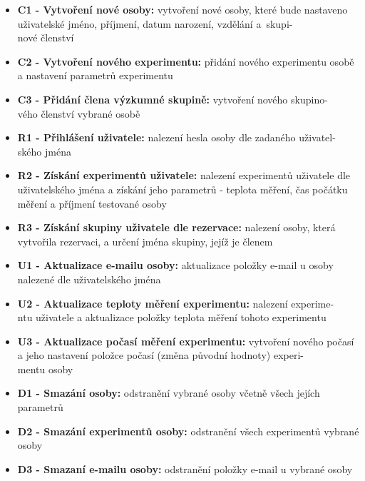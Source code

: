 \documentclass{projekt}
\begin{document}
\begin{itemize}
\item {\bf C1 - Vytvoření nové osoby:} vytvoření nové osoby, které bude nastaveno uživatelské jméno, příjmení, datum narození, vzdělání a~skupi-\\nové členství 
\item {\bf C2 - Vytvoření nového experimentu:} přidání nového experimentu osobě a nastavení  parametrů experimentu
\item {\bf C3 - Přidání člena výzkumné skupině:} vytvoření nového skupino-\\vého členství vybrané osobě

\vspace{0.65cm}

\item {\bf R1 - Přihlášení uživatele:} nalezení hesla osoby dle zadaného uživatel-\\ského jména
\item {\bf R2 - Získání experimentů uživatele:} nalezení experimentů uživatele dle uživatelského jména a získání jeho parametrů - teplota měření, čas počátku měření a příjmení testované osoby
\item {\bf R3 - Získání skupiny uživatele dle rezervace:} nalezení osoby, která vytvořila rezervaci, a určení jména skupiny, jejíž je členem

\vspace{0.65cm}

\item {\bf U1 - Aktualizace e-mailu osoby:} aktualizace položky e-mail u osoby nalezené dle uživatelského jména
\item {\bf U2 - Aktualizace teploty měření experimentu:} nalezení experime-\\ntu uživatele a aktualizace položky teplota měření tohoto experimentu
\item {\bf U3 - Aktualizace počasí měření experimentu:} vytvoření nového počasí a jeho nastavení položce počasí (změna původní hodnoty) experi-\\mentu osoby

\vspace{0.65cm}

\item {\bf D1 - Smazání osoby:} odstranění vybrané osoby včetně všech jejích parametrů
\item {\bf D2 - Smazání experimentů osoby:} odstranění všech experimentů vybrané osoby
\item {\bf D3 - Smazaní e-mailu osoby:} odstranění položky e-mail u vybrané osoby



\end{itemize}
\end{document}
